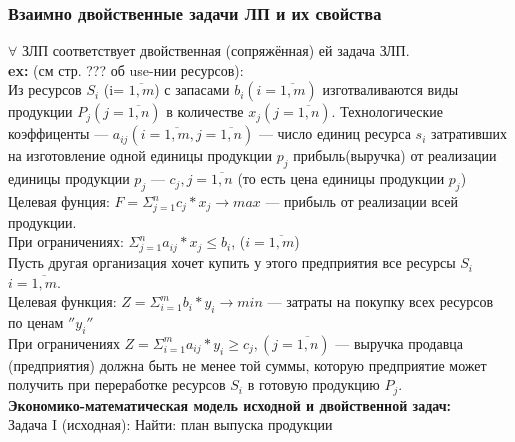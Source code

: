 \subsubsection{Взаимно двойственные задачи ЛП и их свойства}
$\forall$ ЗЛП соответствует двойственная (сопряжённая) ей задача ЗЛП.\\
\textbf{ex:} (см стр. ??? об use-нии ресурсов):\\
Из ресурсов $S_i$ (i= $\overline{1,m}$) с запасами $b_i (i= \overline{1,m})$ изготваливаются виды продукции $P_j (j= \overline{1,n})$ в количестве $x_j (j= \overline{1,n})$. Технологические коэффиценты --- $a_{ij} (i= \overline{1,m}, j= \overline{1,n})$ ---
число единиц ресурса $s_i$ затративших на изготовление одной единицы продукции $p_j$ прибыль(выручка) от реализации единицы продукции $p_j$ --- $c_j, j= \overline{1,n}$ (то есть цена единицы продукции $p_j$)\\
Целевая фунция: $F = \Sigma_{j=1}^n c_j*x_j \rightarrow max $ --- прибыль от реализации всей продукции. \\
При ограничениях: $\Sigma_{j=1}^n a_{ij}*x_j \leq b_i$, ($i=\overline{1,m}$)\\
Пусть другая организация хочет купить у этого предприятия все ресурсы $S_i$ $i=\overline{1,m}$.\\
Целевая функция: $Z = \Sigma_{i=1}^m b_i*y_i \rightarrow min$ --- затраты на покупку всех ресурсов по ценам $''y_i''$ \\
При ограничениях $Z = \Sigma_{i=1}^m a_{ij}*y_i \geq c_j, (j=\overline{1,n})$ --- выручка продавца (предприятия) должна быть не менее той суммы, которую предприятие может получить при переработке ресурсов $S_i$ в готовую продукцию $P_j$.\\
\textbf{Экономико-математическая модель исходной и двойственной задач:} \\
Задача I (исходная):
Найти: план выпуска продукции 
